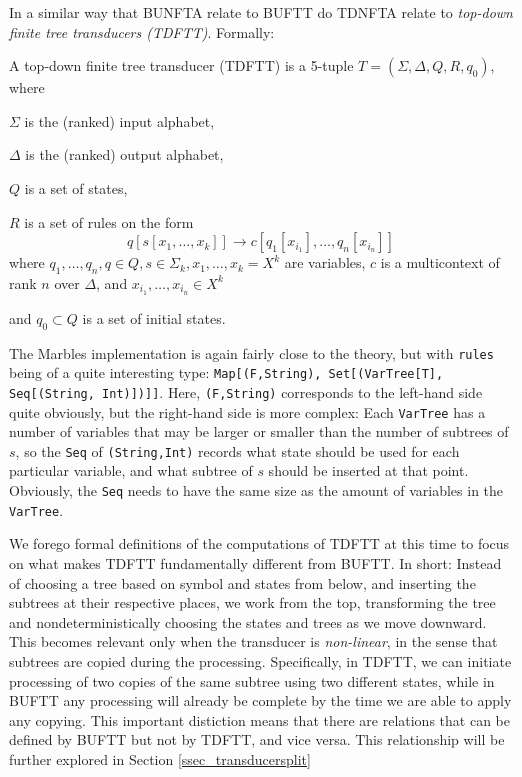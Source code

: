 In a similar way that BUNFTA relate to BUFTT do TDNFTA relate to
\emph{top-down finite tree transducers (TDFTT)}. Formally:

A top-down finite tree transducer (TDFTT) is a 5-tuple $T = (\Sigma,
\Delta, Q, R, q_0)$, where
\begin{compactitem}
\item $\Sigma$ is the (ranked) input alphabet,
\item $\Delta$ is the (ranked) output alphabet,
\item $Q$ is a set of states,
\item $R$ is a set of rules on the form
$$q[s[x_1,\ldots,x_k]] \rightarrow c[q_1[x_i_1],\ldots,q_n[x_i_n]]$$ where
$q_1,\ldots,q_n,q \in Q, s \in \Sigma_k, x_1,\ldots,x_k = X^k$ are variables,
$c$ is a multicontext of rank $n$ over $\Delta$, and $x_i_1,\ldots,x_i_n \in X^k$
\item and $q_0 \subset Q$ is a set of initial states.
\end{compactitem}

The Marbles implementation is again fairly close to the theory, but with
\texttt{rules} being of a quite interesting type: \texttt{Map[(F,String),
Set[(VarTree[T], Seq[(String, Int)])]]}. Here, \texttt{(F,String)}
corresponds to the left-hand side quite obviously, but the right-hand side
is more complex: Each \texttt{VarTree} has a number of variables that may
be larger or smaller than the number of subtrees of $s$, so the \texttt{Seq} of
\texttt{(String,Int)} records what state should be used for each particular
variable, and what subtree of $s$ should be inserted at that point.
Obviously, the \texttt{Seq} needs to have the same size as the amount of
variables in the \texttt{VarTree}.

We forego formal definitions of the computations of TDFTT at this time to
focus on what makes TDFTT fundamentally different from BUFTT. In short:
Instead of choosing a tree based on symbol and states from below, and
inserting the subtrees at their respective places, we work from the top,
transforming the tree and nondeterministically choosing the states and
trees as we move downward.  This becomes relevant only when the transducer
is \emph{non-linear}, in the sense that subtrees are copied during the
processing. Specifically, in TDFTT, we can initiate processing of two
copies of the same subtree using two different states, while in BUFTT any
processing will already be complete by the time we are able to apply any
copying. This important distiction means that there are relations that can
be defined by BUFTT but not by TDFTT, and vice versa. This relationship
will be further explored in Section \ref{ssec_transducersplit}


